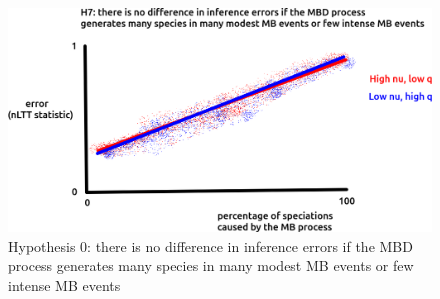 \begin{figure}[!htbp]
  \includegraphics[width=\textwidth]{razzo-figures/fig_h_0.png}
  \caption{
    Hypothesis 0: there is no difference in inference errors if the MBD process
    generates many species in many modest MB events or few intense MB events
  }
  \label{fig:h_0}
\end{figure}